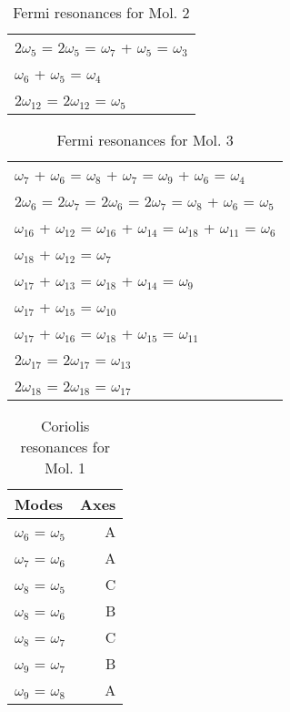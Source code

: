 \begin{table}
\centering
\caption{Fermi resonances for Mol. 2}
\begin{tabular}{l}
2$\omega_{5 }$ = 2$\omega_{5 }$ = $\omega_{7 }$ + $\omega_{5 }$ = $\omega_{3 }$ \\
$\omega_{6 }$ + $\omega_{5 }$ = $\omega_{4 }$ \\
2$\omega_{12}$ = 2$\omega_{12}$ = $\omega_{5 }$ \\
\end{tabular}
\end{table}

\begin{table}
\centering
\caption{Fermi resonances for Mol. 3}
\begin{tabular}{l}
$\omega_{7 }$ + $\omega_{6 }$ = $\omega_{8 }$ + $\omega_{7 }$ = $\omega_{9 }$ + $\omega_{6 }$ = $\omega_{4 }$ \\
2$\omega_{6 }$ = 2$\omega_{7 }$ = 2$\omega_{6 }$ = 2$\omega_{7 }$ = $\omega_{8 }$ + $\omega_{6 }$ = $\omega_{5 }$ \\
$\omega_{16}$ + $\omega_{12}$ = $\omega_{16}$ + $\omega_{14}$ = $\omega_{18}$ + $\omega_{11}$ = $\omega_{6 }$ \\
$\omega_{18}$ + $\omega_{12}$ = $\omega_{7 }$ \\
$\omega_{17}$ + $\omega_{13}$ = $\omega_{18}$ + $\omega_{14}$ = $\omega_{9 }$ \\
$\omega_{17}$ + $\omega_{15}$ = $\omega_{10}$ \\
$\omega_{17}$ + $\omega_{16}$ = $\omega_{18}$ + $\omega_{15}$ = $\omega_{11}$ \\
2$\omega_{17}$ = 2$\omega_{17}$ = $\omega_{13}$ \\
2$\omega_{18}$ = 2$\omega_{18}$ = $\omega_{17}$ \\
\end{tabular}
\end{table}

\begin{table}
\centering
\caption{Coriolis resonances for Mol. 1}
\begin{tabular}{lr}
   Modes &     Axes \\
\hline
$\omega_{6 }$ = $\omega_{5 }$   &  A \\
$\omega_{7 }$ = $\omega_{6 }$   &  A \\
$\omega_{8 }$ = $\omega_{5 }$   &  C \\
$\omega_{8 }$ = $\omega_{6 }$   &  B \\
$\omega_{8 }$ = $\omega_{7 }$   &  C \\
$\omega_{9 }$ = $\omega_{7 }$   &  B \\
$\omega_{9 }$ = $\omega_{8 }$   &  A \\
\end{tabular}
\end{table}

